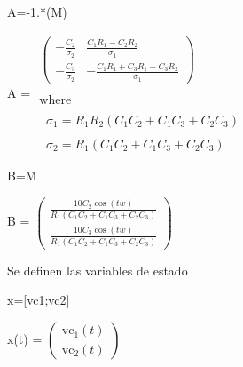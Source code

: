 \documentclass[10pt,a4paper]{article} %
\begin{document}
\begin{matlabcode}
	A=-1.*(M\N)
\end{matlabcode}
\begin{matlabsymbolicoutput}
	A = 
	$\displaystyle \begin{array}{l}
	\left(\begin{array}{cc}
	-\frac{C_2 }{\sigma_2 } & \frac{C_1  R_1 -C_2  R_2 }{\sigma_1 }\\
	-\frac{C_3 }{\sigma_2 } & -\frac{C_1  R_1 +C_3  R_1 +C_3  R_2 }{\sigma_1 }
	\end{array}\right)\\
	\mathrm{}\\
	\textrm{where}\\
	\mathrm{}\\
	\;\;\sigma_1 =R_1  R_2  {\left(C_1  C_2 +C_1  C_3 +C_2  C_3 \right)}\\
	\mathrm{}\\
	\;\;\sigma_2 =R_1  {\left(C_1  C_2 +C_1  C_3 +C_2  C_3 \right)}
	\end{array}$
\end{matlabsymbolicoutput}
\begin{matlabcode}
	
	B=M\u
\end{matlabcode}
\begin{matlabsymbolicoutput}
	B = 
	$\displaystyle \left(\begin{array}{c}
	\frac{10 C_2  \cos \left(t w\right)}{R_1  {\left(C_1  C_2 +C_1  C_3 +C_2  C_3 \right)}}\\
	\frac{10 C_3  \cos \left(t w\right)}{R_1  {\left(C_1  C_2 +C_1  C_3 +C_2  C_3 \right)}}
	\end{array}\right)$
\end{matlabsymbolicoutput}

\begin{par}
	\begin{flushleft}
		Se definen las variables de estado
	\end{flushleft}
\end{par}

\begin{matlabcode}
	x=[vc1;vc2]
\end{matlabcode}
\begin{matlabsymbolicoutput}
	x(t) = 
	$\displaystyle \left(\begin{array}{c}
	{\textrm{vc}}_1 \left(t\right)\\
	{\textrm{vc}}_2 \left(t\right)
	\end{array}\right)$
\end{matlabsymbolicoutput}
\end{document}
